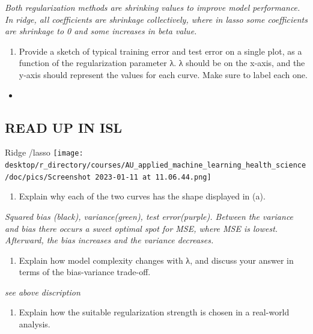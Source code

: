\documentclass[
  letterpaper,
  DIV=11,
  numbers=noendperiod]{scrartcl}
\providecommand{\tightlist}{%
  \setlength{\itemsep}{0pt}\setlength{\parskip}{0pt}}\usepackage{longtable,booktabs,array}
\begin{document}
\emph{Both regularization methods are shrinking values to improve model
performance. In ridge, all coefficients are shrinkage collectively,
where in lasso some coefficients are shrinkage to 0 and some increases
in beta value.}

\begin{enumerate}
\def\labelenumi{(\alph{enumi})}
\tightlist
\item
  Provide a sketch of typical training error and test error on a single
  plot, as a function of the regularization parameter λ. λ should be on
  the x-axis, and the y-axis should represent the values for each curve.
  Make sure to label each one.
\end{enumerate}

\begin{itemize}
\tightlist
\item
\end{itemize}

\hypertarget{read-up-in-isl}{%
\subsection{READ UP IN ISL}\label{read-up-in-isl}}

Ridge /lasso
\texttt{[image: desktop/r\_directory/courses/AU\_applied\_machine\_learning\_health\_science/doc/pics/Screenshot 2023-01-11 at 11.06.44.png]}

\begin{enumerate}
\def\labelenumi{(\alph{enumi})}
\setcounter{enumi}{1}
\tightlist
\item
  Explain why each of the two curves has the shape displayed in (a).
\end{enumerate}

\emph{Squared bias (black), variance(green), test error(purple). Between
the variance and bias there occurs a sweet optimal spot for MSE, where
MSE is lowest. Afterward, the bias increases and the variance
decreases.}

\begin{enumerate}
\def\labelenumi{(\alph{enumi})}
\setcounter{enumi}{2}
\tightlist
\item
  Explain how model complexity changes with λ, and discuss your answer
  in terms of the bias-variance trade-off.
\end{enumerate}

\emph{see above discription}

\begin{enumerate}
\def\labelenumi{(\alph{enumi})}
\setcounter{enumi}{3}
\tightlist
\item
  Explain how the suitable regularization strength is chosen in a
  real-world analysis.
\end{enumerate}
\end{document}
